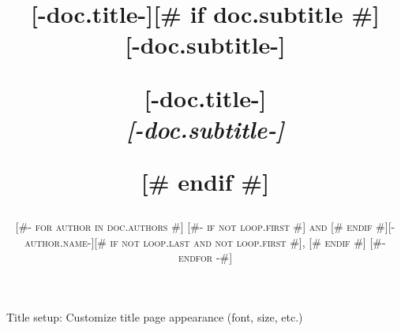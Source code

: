 \usepackage{xcolor} 
\usepackage{hyperref}  %

\usepackage{natbib}  %

\usepackage{enumitem}


Title setup: Customize title page appearance (font, size, etc.)
\title{%
 \Huge \textbf{[-doc.title-]} \\  %
 [# if doc.subtitle #] 
   \vspace{0.5em}
   \huge \textit{[-doc.subtitle-]}\title{\Huge \textbf{[-doc.title-]}[# if doc.subtitle #] \\ \huge [-doc.subtitle-]} %
 [# endif #]
}

\author{\textsc{
[#- for author in doc.authors #]
  [#- if not loop.first #] and [# endif #][-author.name-][# if not loop.last and not loop.first #], [# endif #]
[#- endfor -#]
}}
